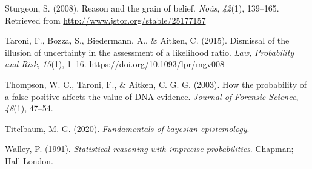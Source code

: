 \documentclass[
  10pt,
  dvipsnames,enabledeprecatedfontcommands]{scrartcl}
\newlength{\cslhangindent}
\newlength{\cslentryspacingunit} %
\newenvironment{CSLReferences}[2] %
 {%
  \setlength{\parindent}{0pt}
  \ifodd #1
  \let\oldpar\par
  \def\par{\hangindent=\cslhangindent\oldpar}
  \fi
  \setlength{\parskip}{#2\cslentryspacingunit}
 }%
 {}
\begin{document}
\begin{CSLReferences}{1}{0}
\leavevmode{}%
Sturgeon, S. (2008). Reason and the grain of belief. \emph{No{û}s},
\emph{42}(1), 139--165. Retrieved from
\url{http://www.jstor.org/stable/25177157}

\leavevmode{}%
Taroni, F., Bozza, S., Biedermann, A., \& Aitken, C. (2015). {Dismissal
of the illusion of uncertainty in the assessment of a likelihood ratio}.
\emph{Law, Probability and Risk}, \emph{15}(1), 1--16.
\url{https://doi.org/10.1093/lpr/mgv008}

\leavevmode{}%
Thompson, W. C., Taroni, F., \& Aitken, C. G. G. (2003). How the
probability of a false positive affects the value of {DNA} evidence.
\emph{Journal of Forensic Science}, \emph{48}(1), 47--54.

\leavevmode{}%
Titelbaum, M. G. (2020). \emph{Fundamentals of bayesian epistemology}.

\leavevmode{}%
Walley, P. (1991). \emph{Statistical reasoning with imprecise
probabilities}. Chapman; Hall London.

\end{CSLReferences}
\end{document}
